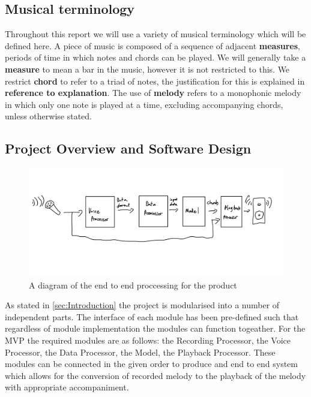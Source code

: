 \subsection{Musical terminology}

Throughout this report we will use a variety of musical terminology which will be defined here. A piece of music is composed of a sequence of adjacent \textbf{measures}, periods of time in which notes and chords can be played. 
We will generally take a \textbf{measure} to mean a bar in the music, however it is not restricted to this. We restrict \textbf{chord} to refer to a triad of notes, the justification for this is explained in \textbf{reference to explanation}.
The use of \textbf{melody} refers to a monophonic melody in which only one note is played at a time, excluding accompanying chords, unless otherwise stated.


\subsection{Project Overview and Software Design}

\begin{figure}
    \centering
    \includegraphics[width=0.8\columnwidth]{Figures/MVPOverview}
    \decoRule
    \caption[]{A diagram of the end to end proccessing for the product}
    \label{fig:MVPOverview}
\end{figure}
As stated in \ref{sec:Introduction} the project is modularised into a number of independent parts.
The interface of each module has been pre-defined such that regardless of module implementation the modules can function togeather. 
For the MVP the required modules are as follows: the Recording Processor, the Voice Processor, the Data Processor, the Model, the Playback Processor.
These modules can be connected in the given order to produce and end to end system which allows for the conversion of recorded melody to the playback of the melody with appropriate accompaniment.

